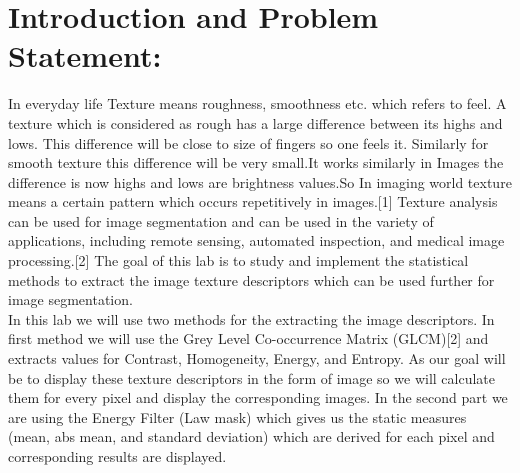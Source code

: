 \documentclass{article}
\begin{document}
\begin{titlepage}




 

\vfill %
\end{titlepage}

\section{Introduction and Problem Statement:}
In everyday life Texture means roughness, smoothness etc. which refers to feel. A texture which is considered as rough has a large difference between its highs and lows. This difference will be close to size of fingers so one feels it. Similarly for smooth texture this difference will be very small.It works similarly in Images the difference is now highs and lows are brightness values.So In imaging world texture means a certain pattern which occurs repetitively in images.[1] Texture analysis can be used for image segmentation and can be used in the variety of applications, including remote sensing, automated inspection, and medical image processing.[2] The goal of this lab is to study and implement the statistical methods to extract the image texture descriptors which can be used further for image segmentation.\\
In this lab we will use two methods for the extracting the image descriptors. In first method we will use the Grey Level Co-occurrence Matrix (GLCM)[2] and extracts values for Contrast, Homogeneity, Energy, and Entropy. As our goal will be to display these texture descriptors in the form of image so we will calculate them for every pixel and display the corresponding images. In the second part we are using the Energy Filter (Law mask) which gives us the static measures (mean, abs mean, and standard deviation) which are derived for each pixel and corresponding results are displayed.
\end{document}
